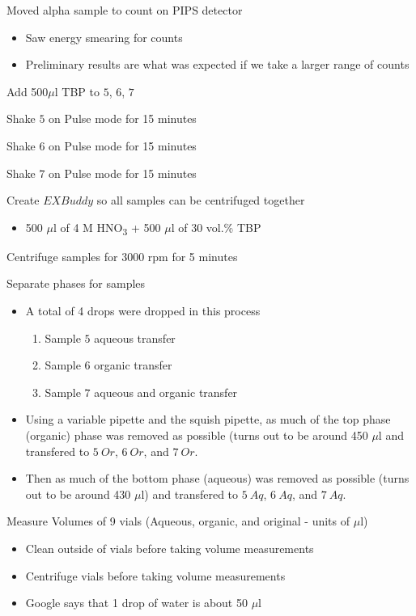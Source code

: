 \documentclass[idxtotoc,hyperref,openany,oneside]{labbook} %
\newcommand{\cmark}{\ding{51}}%
\newcommand{\done}{\rlap{$\square$}{\raisebox{2pt}{\large\hspace{1pt}\cmark}}%
  \hspace{-2.5pt}}
\newcommand{\tsbs}{\textsubscript}
\begin{document}
\begin{todolist}
\item[\done]{Moved alpha sample to count on PIPS detector}
  \begin{itemize}
  \item{Saw energy smearing for counts}
  \item{Preliminary results are what was expected if
    we take a larger range of counts}
  \end{itemize}
\end{todolist}


\begin{todolist}
\item[\done]{Add 500$\mu$l TBP to $\boxed{5}$, $\boxed{6}$,
  $\boxed{7}$}
\item[\done]{Shake $\boxed{5}$ on Pulse mode for 15 minutes}
\item[\done]{Shake $\boxed{6}$ on Pulse mode for 15 minutes}
\item[\done]{Shake $\boxed{7}$ on Pulse mode for 15 minutes}
\item[\done]{Create $\boxed{EX Buddy}$ so all samples can be
  centrifuged together}
  \begin{itemize}
  \item{500 $\mu$l of 4 M HNO\tsbs{3} + 500 $\mu$l of 30 vol.\%
    TBP}
  \end{itemize}
\item[\done]{Centrifuge samples for 3000 rpm for 5 minutes}
\item[\done]{Separate phases for samples}
  \begin{itemize}
  \item{A total of 4 drops were dropped in this process}
    \begin{enumerate}
    \item{Sample $\boxed{5}$ aqueous transfer}
    \item{Sample $\boxed{6}$ organic transfer}
    \item{Sample $\boxed{7}$ aqueous and organic transfer}
    \end{enumerate}
  \item{Using a variable pipette and the squish pipette,
    as much of the top phase (organic) phase was removed as possible
    (turns out to be around 450 $\mu$l and transfered to
    $\boxed{5\ Or}$, $\boxed{6\ Or}$, and $\boxed{7\ Or}$.}
  \item{Then as much of the bottom phase (aqueous) was removed as
    possible (turns out to be around 430 $\mu$l) and transfered
    to $\boxed{5\ Aq}$, $\boxed{6\ Aq}$, and $\boxed{7\ Aq}$.}
  \end{itemize}
\item[\done]{Measure Volumes of 9 vials (Aqueous, organic, and original
  - units of $\mu$l)}
  \begin{itemize}
  \item{Clean outside of vials before taking volume measurements}
  \item{Centrifuge vials before taking volume measurements}
  \item{Google says that 1 drop of water is about 50 $\mu$l}
  \end{itemize}
\end{todolist}
\end{document}
